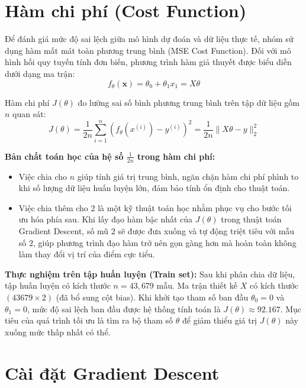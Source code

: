 \section{Hàm chi phí (Cost Function)}

Để đánh giá mức độ sai lệch giữa mô hình dự đoán và dữ liệu thực tế, nhóm sử dụng hàm mất mát toàn phương trung bình (MSE Cost Function). Đối với mô hình hồi quy tuyến tính đơn biến, phương trình hàm giả thuyết được biểu diễn dưới dạng ma trận:
\begin{equation}
    f_{\theta}(\mathbf{x}) = \theta_0 + \theta_1 x_1 = X\theta
\end{equation}

Hàm chi phí $J(\theta)$ đo lường sai số bình phương trung bình trên tập dữ liệu gồm $n$ quan sát:
\begin{equation}
    J(\theta) = \frac{1}{2n}\sum_{i=1}^{n}\left(f_{\theta}(x^{(i)}) - y^{(i)}\right)^2 = \frac{1}{2n}\|X\theta - y\|_2^2
\end{equation}

\noindent\textbf{Bản chất toán học của hệ số $\frac{1}{2n}$ trong hàm chi phí:}
\begin{itemize}
    \item Việc chia cho $n$ giúp tính giá trị trung bình, ngăn chặn hàm chi phí phình to khi số lượng dữ liệu huấn luyện lớn, đảm bảo tính ổn định cho thuật toán.
    \item Việc chia thêm cho $2$ là một kỹ thuật toán học nhằm phục vụ cho bước tối ưu hóa phía sau. Khi lấy đạo hàm bậc nhất của $J(\theta)$ trong thuật toán Gradient Descent, số mũ $2$ sẽ được đưa xuống và tự động triệt tiêu với mẫu số $2$, giúp phương trình đạo hàm trở nên gọn gàng hơn mà hoàn toàn không làm thay đổi vị trí của điểm cực tiểu.
\end{itemize}

\textbf{Thực nghiệm trên tập huấn luyện (Train set):} Sau khi phân chia dữ liệu, tập huấn luyện có kích thước $n = 43,679$ mẫu. Ma trận thiết kế $X$ có kích thước $(43679 \times 2)$ (đã bổ sung cột bias). Khi khởi tạo tham số ban đầu $\theta_0 = 0$ và $\theta_1 = 0$, mức độ sai lệch ban đầu được hệ thống tính toán là $J(\theta) \approx 92.167$. Mục tiêu của quá trình tối ưu là tìm ra bộ tham số $\theta$ để giảm thiểu giá trị $J(\theta)$ này xuống mức thấp nhất có thể.

\section{Cài đặt Gradient Descent}

